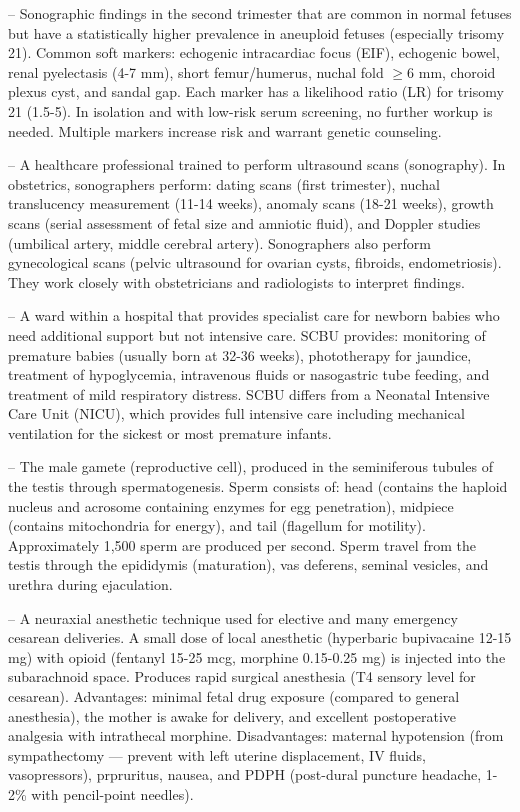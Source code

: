 -- Sonographic findings in the second trimester that are common in normal fetuses but have a statistically higher prevalence in aneuploid fetuses (especially trisomy 21). Common soft markers: echogenic intracardiac focus (EIF), echogenic bowel, renal pyelectasis (4-7 mm), short femur/humerus, nuchal fold \(\ge\)6 mm, choroid plexus cyst, and sandal gap. Each marker has a likelihood ratio (LR) for trisomy 21 (1.5-5). In isolation and with low-risk serum screening, no further workup is needed. Multiple markers increase risk and warrant genetic counseling.

-- A healthcare professional trained to perform ultrasound scans (sonography). In obstetrics, sonographers perform: dating scans (first trimester), nuchal translucency measurement (11-14 weeks), anomaly scans (18-21 weeks), growth scans (serial assessment of fetal size and amniotic fluid), and Doppler studies (umbilical artery, middle cerebral artery). Sonographers also perform gynecological scans (pelvic ultrasound for ovarian cysts, fibroids, endometriosis). They work closely with obstetricians and radiologists to interpret findings.

-- A ward within a hospital that provides specialist care for newborn babies who need additional support but not intensive care. SCBU provides: monitoring of premature babies (usually born at 32-36 weeks), phototherapy for jaundice, treatment of hypoglycemia, intravenous fluids or nasogastric tube feeding, and treatment of mild respiratory distress. SCBU differs from a Neonatal Intensive Care Unit (NICU), which provides full intensive care including mechanical ventilation for the sickest or most premature infants.

-- The male gamete (reproductive cell), produced in the seminiferous tubules of the testis through spermatogenesis. Sperm consists of: head (contains the haploid nucleus and acrosome containing enzymes for egg penetration), midpiece (contains mitochondria for energy), and tail (flagellum for motility). Approximately 1,500 sperm are produced per second. Sperm travel from the testis through the epididymis (maturation), vas deferens, seminal vesicles, and urethra during ejaculation.

-- A neuraxial anesthetic technique used for elective and many emergency cesarean deliveries. A small dose of local anesthetic (hyperbaric bupivacaine 12-15 mg) with opioid (fentanyl 15-25 mcg, morphine 0.15-0.25 mg) is injected into the subarachnoid space. Produces rapid surgical anesthesia (T4 sensory level for cesarean). Advantages: minimal fetal drug exposure (compared to general anesthesia), the mother is awake for delivery, and excellent postoperative analgesia with intrathecal morphine. Disadvantages: maternal hypotension (from sympathectomy — prevent with left uterine displacement, IV fluids, vasopressors), prpruritus, nausea, and PDPH (post-dural puncture headache, 1-2\% with pencil-point needles).

